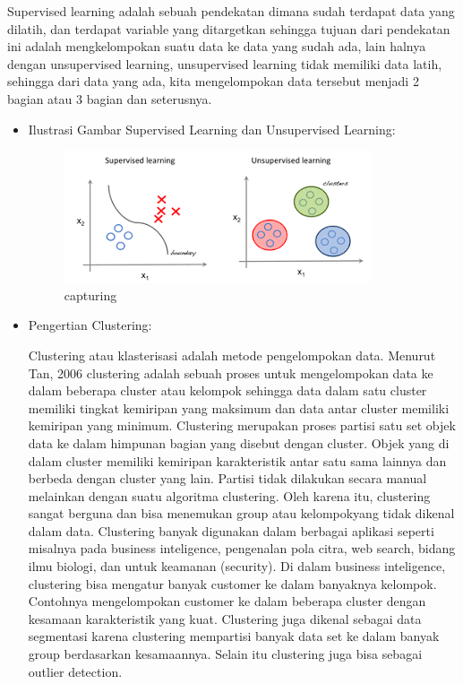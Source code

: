 \begin{enumerate}
\begin{itemize}
Supervised learning adalah sebuah pendekatan dimana sudah terdapat data yang dilatih, dan terdapat variable yang ditargetkan sehingga tujuan dari pendekatan ini adalah mengkelompokan suatu data ke data yang sudah ada, lain halnya dengan unsupervised learning, unsupervised learning tidak memiliki data latih, sehingga dari data yang ada, kita mengelompokan data tersebut menjadi 2 bagian atau 3 bagian dan seterusnya.

\begin{itemize}
\item Ilustrasi Gambar Supervised Learning dan Unsupervised Learning:

\begin{figure}[ht]
\centering
\includegraphics[scale=0.5]{figures/Chapter2-AnnisaFathoroni2.png}
\caption{capturing}
\label{contoh}
\end{figure}

\item Pengertian Clustering:

Clustering atau klasterisasi adalah metode pengelompokan data. Menurut Tan, 2006 clustering adalah sebuah proses untuk mengelompokan data ke dalam beberapa cluster atau kelompok sehingga data dalam satu cluster memiliki tingkat kemiripan yang maksimum dan data antar cluster memiliki kemiripan yang minimum. Clustering merupakan proses partisi satu set objek data ke dalam himpunan bagian yang disebut dengan cluster. Objek yang di dalam cluster memiliki kemiripan karakteristik antar satu sama lainnya dan berbeda dengan cluster yang lain. Partisi tidak dilakukan secara manual melainkan dengan suatu algoritma clustering. Oleh karena itu, clustering sangat berguna dan bisa menemukan group atau kelompokyang tidak dikenal dalam data. Clustering banyak digunakan dalam berbagai aplikasi seperti misalnya pada business inteligence, pengenalan pola citra, web search, bidang ilmu biologi, dan untuk keamanan (security). Di dalam business inteligence, clustering bisa mengatur banyak customer ke dalam banyaknya kelompok. Contohnya mengelompokan customer ke dalam beberapa cluster dengan kesamaan karakteristik yang kuat. Clustering juga dikenal sebagai data segmentasi karena clustering mempartisi banyak data set ke dalam banyak group berdasarkan kesamaannya. Selain itu clustering juga bisa sebagai outlier detection.


\end{itemize}
\end{itemize}
\end{enumerate}
